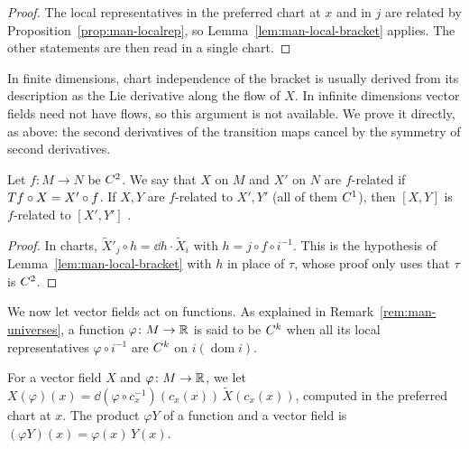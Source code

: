 \begin{proof}
  \leanok
  The local representatives in the preferred chart at $x$ and in $j$ are related by
  Proposition~\ref{prop:man-localrep}, so Lemma~\ref{lem:man-local-bracket} applies. The other
  statements are then read in a single chart.
\end{proof}

\begin{remark}[No flows]
  \label{rem:man-no-flows}
  In finite dimensions, chart independence of the bracket is usually derived from its
  description as the Lie derivative along the flow of $X$. In infinite dimensions vector fields
  need not have flows, so this argument is not available. We prove it directly, as above: the
  second derivatives of the transition maps cancel by the symmetry of second derivatives.
\end{remark}

\begin{theorem}
  \label{thm:man-related}
  \leanok
  Let $f \colon M \to N$ be $C^{2}$. We say that $X$ on $M$ and $X'$ on $N$ are $f$-related if
  $T f \circ X = X' \circ f$. If $X, Y$ are $f$-related to $X', Y'$ (all of them $C^{1}$), then
  $[X, Y]$ is $f$-related to $[X', Y']$ \cite[\S V.1]{Lan99}.
\end{theorem}

\begin{proof}
  \leanok
  In charts, $\widetilde{X}'_j \circ h = \dd h \cdot \widetilde{X}_i$ with $h = j \circ f \circ
  i^{-1}$. This is the hypothesis of Lemma~\ref{lem:man-local-bracket} with $h$ in place of
  $\tau$, whose proof only uses that $\tau$ is $C^{2}$.
\end{proof}

We now let vector fields act on functions. As explained in Remark~\ref{rem:man-universes}, a
function $\varphi \colon M \to \mathbb{R}$ is said to be $C^{k}$ when all its local representatives
$\varphi \circ i^{-1}$ are $C^{k}$ on $i(\operatorname{dom} i)$.

\begin{definition}
  \label{def:man-vf-deriv}
  \leanok
  For a vector field $X$ and $\varphi \colon M \to \mathbb{R}$, we let
  $X(\varphi)(x) = \dd(\varphi \circ c_x^{-1})(c_x(x))\,\widetilde{X}(c_x(x))$, computed in the
  preferred chart at $x$. The product $\varphi Y$ of a function and a vector field is
  $(\varphi Y)(x) = \varphi(x)\,Y(x)$.
\end{definition}

